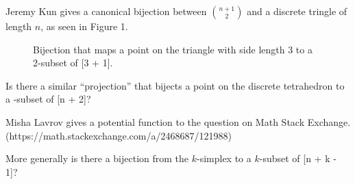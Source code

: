 \documentclass{article}
\begin{document}
Jeremy Kun gives a canonical bijection between $\binom{n + 1}{2}$ and a discrete
tringle of length $n$, as seen in Figure 1.
\begin{figure}[!h]
  \centering
  \caption{Bijection that maps a point on the triangle with side length 3 to a 2-subset of [3 + 1].}
\end{figure}

\begin{question}
  Is there a similar ``projection'' that bijects a point on the discrete
  tetrahedron to a -subset of [n + 2]?
\end{question}

\begin{note}
  Misha Lavrov gives a potential function to the question on Math Stack Exchange. \\
  (https://math.stackexchange.com/a/2468687/121988)
\end{note}

\begin{related}
  \item More generally is there a bijection from the $k$-simplex to a $k$-subset of [n + k - 1]?
\end{related}
\end{document}
